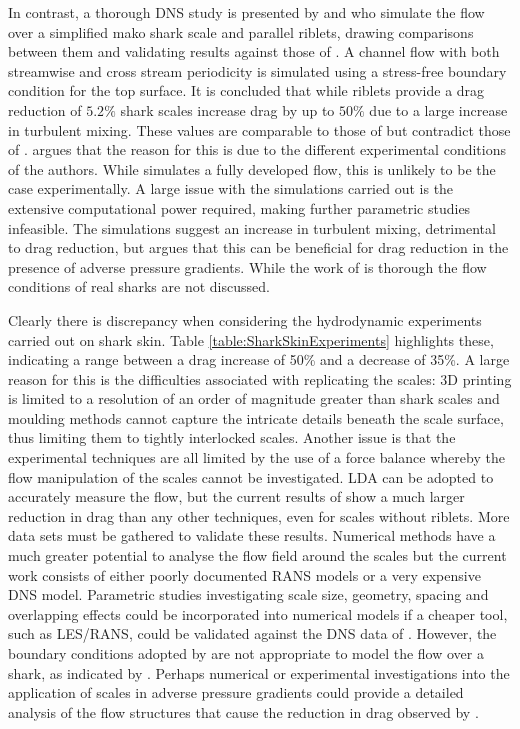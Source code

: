\documentclass[12pt,oneside,a4paper]{article}
\begin{document}
In contrast, a thorough DNS study is presented by \cite{boomsma2015} and \cite{boomsma2016} who simulate the flow over a simplified mako shark scale and parallel riblets, drawing comparisons between them and validating results against those of \cite{bechert1985}. A channel flow with both streamwise and cross stream periodicity is simulated using a stress-free boundary condition for the top surface. It is concluded that while riblets provide a drag reduction of $5.2\%$ shark scales increase drag by up to $50\%$ due to a large increase in turbulent mixing. These values are comparable to those of \cite{bechert1985} but contradict those of \cite{wen2014,wen2015}. \cite{boomsma2015} argues that the reason for this is due to the different experimental conditions of the authors. While \cite{boomsma2015} simulates a fully developed flow, this is unlikely to be the case experimentally. A large issue with the simulations carried out is the extensive computational power required, making further parametric studies infeasible. The simulations suggest an increase in turbulent mixing, detrimental to drag reduction, but \cite{bechert1985} argues that this can be beneficial for drag reduction in the presence of adverse pressure gradients. While the work of \cite{boomsma2015} is thorough the flow conditions of real sharks are not discussed.

Clearly there is discrepancy when considering the hydrodynamic experiments carried out on shark skin. Table \ref{table:SharkSkinExperiments} highlights these, indicating a range between a drag increase of 50\% and a decrease of 35\%. A large reason for this is the difficulties associated with replicating the scales: 3D printing is limited to a resolution of an order of magnitude greater than shark scales and moulding methods cannot capture the intricate details beneath the scale surface, thus limiting them to tightly interlocked scales. Another issue is that the experimental techniques are all limited by the use of a force balance whereby the flow manipulation of the scales cannot be investigated. LDA can be adopted to accurately measure the flow, but the current results of \cite{fletcher2014phd} show a much larger reduction in drag than any other techniques, even for scales without riblets. More data sets must be gathered to validate these results. Numerical methods have a much greater potential to analyse the flow field around the scales but the current work consists of either poorly documented RANS models or a very expensive DNS model. Parametric studies investigating scale size, geometry, spacing and overlapping effects could be incorporated into numerical models if a cheaper tool, such as LES/RANS, could be validated against the DNS data of \cite{boomsma2015}. However, the boundary conditions adopted by \cite{boomsma2015} are not appropriate to model the flow over a shark, as indicated by \cite{wen2014,wen2015}. Perhaps numerical or experimental investigations into the application of scales in adverse pressure gradients could provide a detailed analysis of the flow structures that cause the reduction in drag observed by \cite{wen2014,wen2015}.
\end{document}
